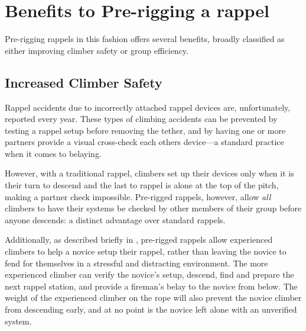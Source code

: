 \documentclass[nonacm,acmtog]{acmart}
\begin{document}


\section{Benefits to Pre-rigging a rappel}
\label{sec:benefits}

  Pre-rigging rappels in this fashion offers several benefits, broadly
  classified as either improving climber safety or group efficiency.

\subsection{Increased Climber Safety}

  Rappel accidents due to incorrectly attached rappel devices are,
  unfortunately, reported every year.  These types of climbing accidents can be
  prevented by testing a rappel setup before removing the tether, and by having
  one or more partners provide a visual cross-check each others device---a
  standard practice when it comes to belaying.

  However, with a traditional rappel, climbers set up their devices only when
  it is their turn to descend and the last to rappel is alone at the top of the
  pitch, making a partner check impossible.  Pre-rigged rappels, however, allow
  {\em all} climbers to have their systems be checked by other members of their
  group before anyone descends: a distinct advantage over standard rappels.

  Additionally, as described briefly in , pre-rigged rappels
  allow experienced climbers to help a novice setup their rappel, rather than
  leaving the novice to fend for themselves in a stressful and distracting
  environment.  The more experienced climber can verify the novice's setup,
  descend, find and prepare the next rappel station, and provide a fireman's
  belay to the novice from below.  The weight of the experienced climber on the
  rope will also prevent the novice climber from descending early, and at no
  point is the novice left alone with an unverified system.
\end{document}
